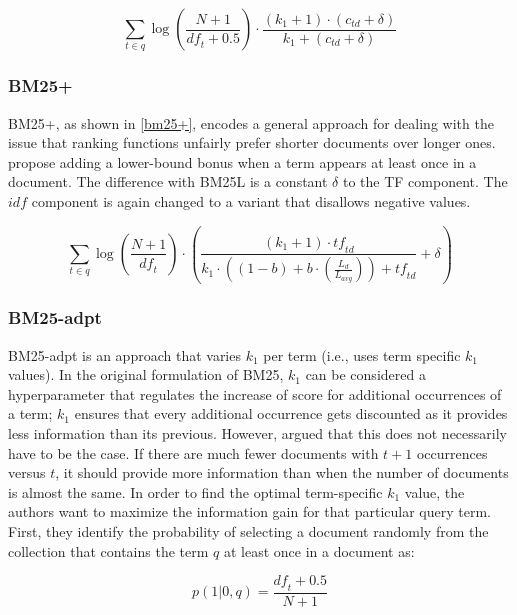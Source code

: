 \begin{equation}
	\label{bm25l}
	\sum_{t\in q} \log\left(\frac{N+1}{\mathit{df}_t + 0.5}\right)\cdot\frac{(k_1 + 1)\cdot(c_{\mathit{td}} + \delta)}{k_1 + (c_{\mathit{td}} + \delta)}
\end{equation}

\subsubsection{BM25+~\citep{bm25+}}
BM25+, as shown in \cref{bm25+}, encodes a general approach for dealing with the issue that ranking functions unfairly prefer shorter documents over longer ones.  propose adding a lower-bound bonus when a term appears at least once in a document. The difference with BM25L is a constant $\delta$ to the TF component. The $\mathit{idf}$ component is again changed to a variant that disallows negative values.

\begin{equation}
	\label{bm25+}
	\sum_{t\in q} \log\left(\frac{N+1}{\mathit{df}_t}\right)\cdot\left(\frac{\left(k_1 + 1\right)\cdot \mathit{tf}_{\mathit{td}}}{k_1\cdot\left(\left(1-b\right)+b\cdot\left(\frac{L_d}{L_{\mathit{avg}}}\right)\right)+\mathit{tf}_{\mathit{td}}}+\delta\right)
\end{equation}

\subsubsection{BM25-adpt~\citep{bm25-adpt}}
BM25-adpt is an approach that varies $k_1$ per term (i.e., uses term specific $k_1$ values). In the original formulation of BM25, $k_1$ can be considered a hyperparameter that regulates the increase of score for additional occurrences of a term; $k_1$ ensures that every additional occurrence gets discounted as it provides less information than its previous. However, \citeauthor{bm25-adpt} argued that this does not necessarily have to be the case. If there are much fewer documents with $t+1$ occurrences versus $t$, it should provide more information than when the number of documents is almost the same. In order to find the optimal term-specific $k_1$ value, the authors want to maximize the information gain for that particular query term. 
First, they identify the probability of selecting a document randomly from the collection that contains the term $q$ at least once in a document as:

\begin{equation}
	p(1|0,q) = \frac{\mathit{df}_t+0.5}{N+1}
\end{equation}

